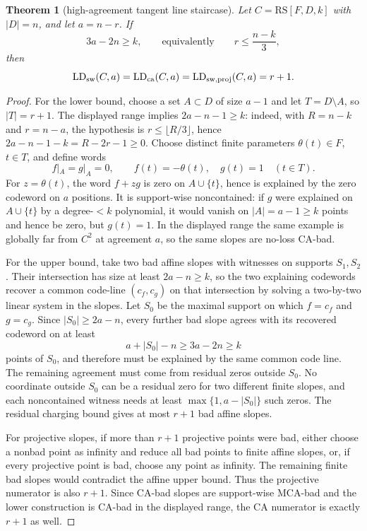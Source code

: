 \documentclass[11pt]{article}
\newtheorem{theorem}{Theorem}[section]
\theoremstyle{definition}
\newcommand{\RS}{\mathrm{RS}}
\begin{document}
\begin{theorem}[high-agreement tangent line staircase]\label{thm:B-high-agreement-line-staircase}
Let \(C=\RS[F,D,k]\) with \(|D|=n\), and let \(a=n-r\).  If
\[
        3a-2n\ge k,
        \qquad\text{equivalently}\qquad
        r\le \frac{n-k}{3},
\]
then
\[
        \operatorname{LD}_{\rm sw}(C,a)
        =\operatorname{LD}_{\rm ca}(C,a)
        =\operatorname{LD}_{\rm sw,proj}(C,a)
        =r+1.
\]
\end{theorem}

\begin{proof}
For the lower bound, choose a set \(A\subset D\) of size \(a-1\) and let
\(T=D\setminus A\), so \(|T|=r+1\).  The displayed range implies
\(2a-n-1\ge k\): indeed, with \(R=n-k\) and \(r=n-a\), the hypothesis is
\(r\le \lfloor R/3\rfloor\), hence \(2a-n-1-k=R-2r-1\ge0\).  Choose distinct finite parameters
\(\theta(t)\in F\), \(t\in T\), and define words
\[
        f|_A=g|_A=0,
        \qquad f(t)=-\theta(t),\quad g(t)=1\quad(t\in T).
\]
For \(z=\theta(t)\), the word \(f+zg\) is zero on \(A\cup\{t\}\), hence is
explained by the zero codeword on \(a\) positions.  It is support-wise
noncontained: if \(g\) were explained on \(A\cup\{t\}\) by a degree-\(<k\)
polynomial, it would vanish on \(|A|=a-1\ge k\) points and hence be zero, but
\(g(t)=1\).  In the displayed range the same example is globally far from
\(C^2\) at agreement \(a\), so the same slopes are no-loss CA-bad.

For the upper bound, take two bad affine slopes with witnesses on supports
\(S_1,S_2\).  Their intersection has size at least \(2a-n\ge k\), so the two
explaining codewords recover a common code-line \((c_f,c_g)\) on that
intersection by solving a two-by-two linear system in the slopes.  Let \(S_0\)
be the maximal support on which \(f=c_f\) and \(g=c_g\).  Since
\(|S_0|\ge2a-n\), every further bad slope agrees with its recovered codeword on
at least
\[
        a+|S_0|-n\ge 3a-2n\ge k
\]
points of \(S_0\), and therefore must be explained by the same common code line.
The remaining agreement must come from residual zeros outside \(S_0\).  No
coordinate outside \(S_0\) can be a residual zero for two different finite
slopes, and each noncontained witness needs at least
\(\max\{1,a-|S_0|\}\) such zeros.  The residual charging bound gives at most
\(r+1\) bad affine slopes.

For projective slopes, if more than \(r+1\) projective points were bad, either
choose a nonbad point as infinity and reduce all bad points to finite affine
slopes, or, if every projective point is bad, choose any point as infinity.  The
remaining finite bad slopes would contradict the affine upper bound.  Thus the
projective numerator is also \(r+1\).  Since CA-bad slopes are support-wise
MCA-bad and the lower construction is CA-bad in the displayed range, the CA
numerator is exactly \(r+1\) as well.
\end{proof}
\end{document}
